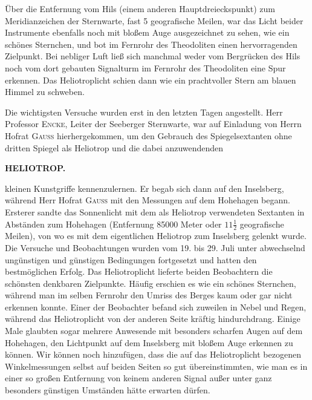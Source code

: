 \par\noindent\hspace*{\parindent}Über die Entfernung vom Hils (einem anderen Hauptdreieckspunkt) zum Meridianzeichen der Sternwarte, fast 5 geografische Meilen, war das Licht beider Instrumente ebenfalls noch mit bloßem Auge ausgezeichnet zu sehen, wie ein schönes Sternchen, und bot im Fernrohr des Theodoliten einen hervorragenden Zielpunkt. Bei nebliger Luft ließ sich manchmal weder vom Bergrücken des Hils noch vom dort gebauten Signalturm im Fernrohr des Theodoliten eine Spur erkennen. Das Heliotroplicht schien dann wie ein prachtvoller Stern am blauen Himmel zu schweben.

\par\noindent\hspace*{\parindent}Die wichtigsten Versuche wurden erst in den letzten Tagen angestellt. Herr Professor \textsc{Encke}, Leiter der Seeberger Sternwarte, war auf Einladung von Herrn Hofrat \textsc{Gauss} hierhergekommen, um den Gebrauch des Spiegelsextanten ohne dritten Spiegel als Heliotrop und die dabei anzuwendenden

\par\clearpage
\noindent\null\hfill{\small\textbf{HELIOTROP.}}\hfill{}\par\medskip
\noindent kleinen Kunstgriffe kennenzulernen. Er begab sich dann auf den Inselsberg, während Herr Hofrat \textsc{Gauss} mit den Messungen auf dem Hohehagen begann. Ersterer sandte das Sonnenlicht mit dem als Heliotrop verwendeten Sextanten in Abständen zum Hohehagen (Entfernung 85000 Meter oder $11\frac12$ geografische Meilen), von wo es mit dem eigentlichen Heliotrop zum Inselsberg gelenkt wurde. Die Versuche und Beobachtungen wurden vom 19. bis 29. Juli unter abwechselnd ungünstigen und günstigen Bedingungen fortgesetzt und hatten den bestmöglichen Erfolg. Das Heliotroplicht lieferte beiden Beobachtern die schönsten denkbaren Zielpunkte. Häufig erschien es wie ein schönes Sternchen, während man im selben Fernrohr den Umriss des Berges kaum oder gar nicht erkennen konnte. Einer der Beobachter befand sich zuweilen in Nebel und Regen, während das Heliotroplicht von der anderen Seite kräftig hindurchdrang. Einige Male glaubten sogar mehrere Anwesende mit besonders scharfen Augen auf dem Hohehagen, den Lichtpunkt auf dem Inselsberg mit bloßem Auge erkennen zu können. Wir können noch hinzufügen, dass die auf das Heliotroplicht bezogenen Winkelmessungen selbst auf beiden Seiten so gut übereinstimmten, wie man es in einer so großen Entfernung von keinem anderen Signal außer unter ganz besonders günstigen Umständen hätte erwarten dürfen.

